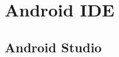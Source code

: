 \documentclass{beamer}
\begin{document}
\section{Android IDE}


\subsection{Android Studio}
\end{document}
